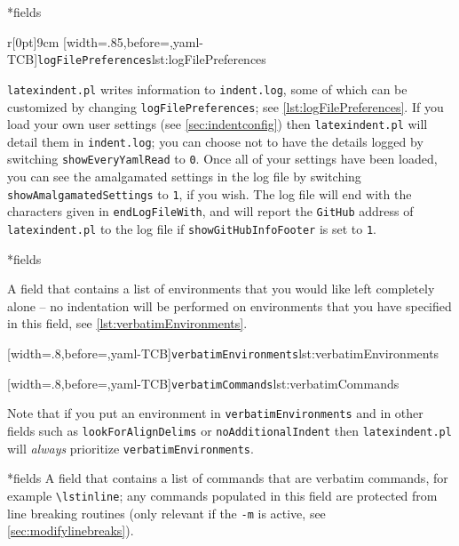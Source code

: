 *{fields}
	\begin{wrapfigure}[10]{r}[0pt]{9cm}
		[width=.85\linewidth,before=\centering,yaml-TCB]{\texttt{logFilePreferences}}{lst:logFilePreferences}
	\end{wrapfigure}
	\texttt{latexindent.pl} writes information to \texttt{indent.log}, some
	of which can be customized by changing \texttt{logFilePreferences}; see \cref{lst:logFilePreferences}.
	If you load your own user settings (see \vref{sec:indentconfig}) then \texttt{latexindent.pl} will
	detail them in \texttt{indent.log}; you can choose not to have the details logged by switching
	\texttt{showEveryYamlRead} to \texttt{0}. Once all of your settings have
	been loaded, you can see the amalgamated settings in the log file by switching \texttt{showAmalgamatedSettings}
	to \texttt{1}, if you wish. The log file will end with the characters
	given in \texttt{endLogFileWith}, and will report the \texttt{GitHub} address
	of \texttt{latexindent.pl} to the log file if \texttt{showGitHubInfoFooter} is set to \texttt{1}.

*{fields}

	A field that contains a list of environments
	that you would like left completely alone -- no indentation will be performed
	on environments that you have specified in this field, see \cref{lst:verbatimEnvironments}.

	\begin{minipage}{.45\textwidth}
		[width=.8\linewidth,before=\centering,yaml-TCB]{\texttt{verbatimEnvironments}}{lst:verbatimEnvironments}
	\end{minipage}%
	\begin{minipage}{.45\textwidth}
		[width=.8\linewidth,before=\centering,yaml-TCB]{\texttt{verbatimCommands}}{lst:verbatimCommands}
	\end{minipage}%

	Note that if  you put an environment in  \texttt{verbatimEnvironments}
	and in other fields such as \texttt{lookForAlignDelims} or \texttt{noAdditionalIndent}
	then \texttt{latexindent.pl} will \emph{always} prioritize  \texttt{verbatimEnvironments}.

*{fields}
	A field that contains a list of commands that are verbatim commands, for example
	\lstinline|\lstinline|; any commands populated in this field are protected from line breaking
	routines (only relevant if the \texttt{-m} is active, see \vref{sec:modifylinebreaks}).


